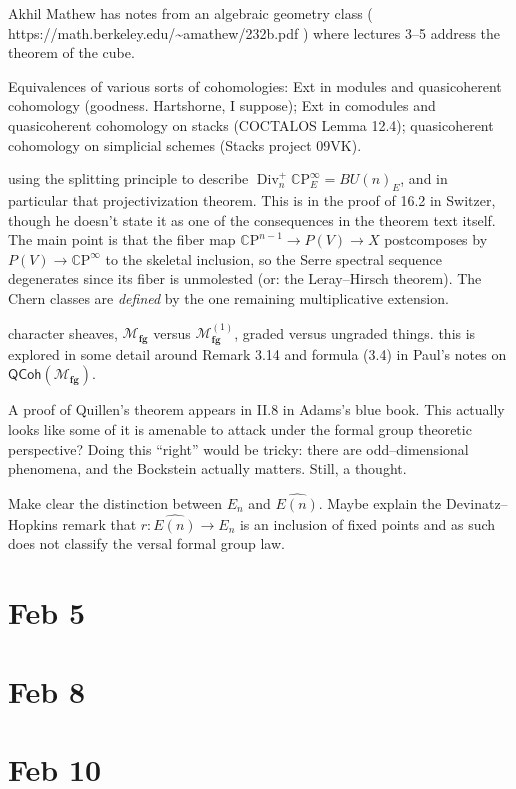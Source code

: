 \documentclass{amsart}
\newcommand{\C}{\mathbb{C}}
\newcommand{\CP}{\C\mathrm P}
\newcommand{\<}{\langle}
\renewcommand{\>}{\rangle}
\newcommand{\CatOf}[1]{\mathsf{#1}}
\newcommand{\moduli}[1]{\mathcal{M}_{\mathbf{#1}}}
\DeclareMathOperator{\Div}{Div}
\numberwithin{equation}{section}
\theoremstyle{plain}
\theoremstyle{definition}
\theoremstyle{remark}
\begin{document}
Akhil Mathew has notes from an algebraic geometry class ( https://math.berkeley.edu/{\textasciitilde}amathew/232b.pdf ) where lectures 3--5 address the theorem of the cube.

Equivalences of various sorts of cohomologies: Ext in modules and quasicoherent cohomology (goodness. Hartshorne, I suppose); Ext in comodules and quasicoherent cohomology on stacks (COCTALOS Lemma 12.4); quasicoherent cohomology on simplicial schemes (Stacks project 09VK).

using the splitting principle to describe $\Div^+_n \CP^\infty_E = BU(n)_E$, and in particular that projectivization theorem. This is in the proof of 16.2 in Switzer, though he doesn't state it as one of the consequences in the theorem text itself. The main point is that the fiber map $\CP^{n-1} \to P(V) \to X$ postcomposes by $P(V) \to \CP^\infty$ to the skeletal inclusion, so the Serre spectral sequence degenerates since its fiber is unmolested (or: the Leray--Hirsch theorem). The Chern classes are \emph{defined} by the one remaining multiplicative extension.

character sheaves, $\moduli{fg}$ versus $\moduli{fg}^{(1)}$, graded versus ungraded things. this is explored in some detail around Remark 3.14 and formula (3.4) in Paul's notes on $\CatOf{QCoh}(\moduli{fg})$.

A proof of Quillen's theorem appears in II.8 in Adams's blue book. This actually looks like some of it is amenable to attack under the formal group theoretic perspective? Doing this ``right'' would be tricky: there are odd--dimensional phenomena, and the Bockstein actually matters. Still, a thought.

Make clear the distinction between $E_n$ and $\widehat{E(n)}$. Maybe explain the Devinatz--Hopkins remark that $r: \widehat{E(n)} \to E_n$ is an inclusion of fixed points and as such does not classify the versal formal group law.





\section{Feb 5}

\section{Feb 8}

\section{Feb 10}
\end{document}
